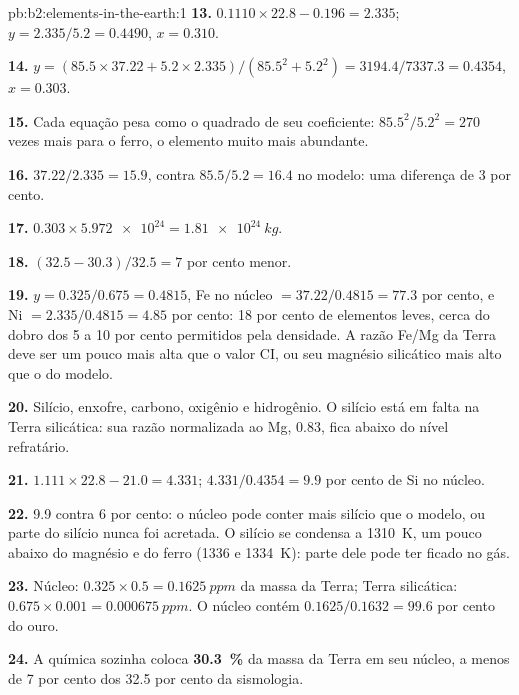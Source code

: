 \begin{solution}{pb:b2:elements-in-the-earth:1}
\textbf{13.} $0.1110\times22.8 - 0.196 = 2.335$; $y = 2.335/5.2 = 0.4490$, $x = 0.310$.

\textbf{14.} $y = (85.5\times37.22 + 5.2\times2.335)/(85.5^2 + 5.2^2) =
3194.4/7337.3 = 0.4354$, $x = 0.303$.

\textbf{15.} Cada equação pesa como o quadrado de seu coeficiente: $85.5^2/5.2^2 = 270$
vezes mais para o ferro, o elemento muito mais abundante.

\textbf{16.} $37.22/2.335 = 15.9$, contra $85.5/5.2 = 16.4$ no modelo: uma diferença de 3 por
cento.

\textbf{17.} $0.303\times\num{5.972e24} = \qty{1.81e24}{kg}$.

\textbf{18.} $(32.5-30.3)/32.5 = 7$ por cento menor.

\textbf{19.} $y = 0.325/0.675 = 0.4815$, Fe no núcleo $= 37.22/0.4815 = 77.3$ por cento,
e Ni $= 2.335/0.4815 = 4.85$ por cento: 18 por cento de elementos leves, cerca do dobro dos 5 a
10 por cento permitidos pela densidade. A razão Fe/Mg da Terra deve ser um pouco mais alta que o valor
CI, ou seu magnésio silicático mais alto que o do modelo.

\textbf{20.} Silício, enxofre, carbono, oxigênio e hidrogênio. O silício está em falta na
Terra silicática: sua razão normalizada ao Mg, 0.83, fica abaixo do nível refratário.

\textbf{21.} $1.111\times22.8 - 21.0 = 4.331$; $4.331/0.4354 = 9.9$ por cento de Si no
núcleo.

\textbf{22.} 9.9 contra 6 por cento: o núcleo pode conter mais silício que o modelo, ou
parte do silício nunca foi acretada. O silício se condensa a \qty{1310}{K}, um pouco
abaixo do magnésio e do ferro (1336 e \qty{1334}{K}): parte dele pode ter ficado no gás.

\textbf{23.} Núcleo: $0.325\times0.5 = \qty{0.1625}{ppm}$ da massa da Terra; Terra
silicática: $0.675\times0.001 = \qty{0.000675}{ppm}$. O núcleo contém
$0.1625/0.1632 = 99.6$ por cento do ouro.

\textbf{24.} A química sozinha coloca
\textbf{\qty[text-series-to-math=true]{30.3}{\percent}} da massa da Terra em seu núcleo,
a menos de 7 por cento dos 32.5 por cento da sismologia.
\end{solution}
